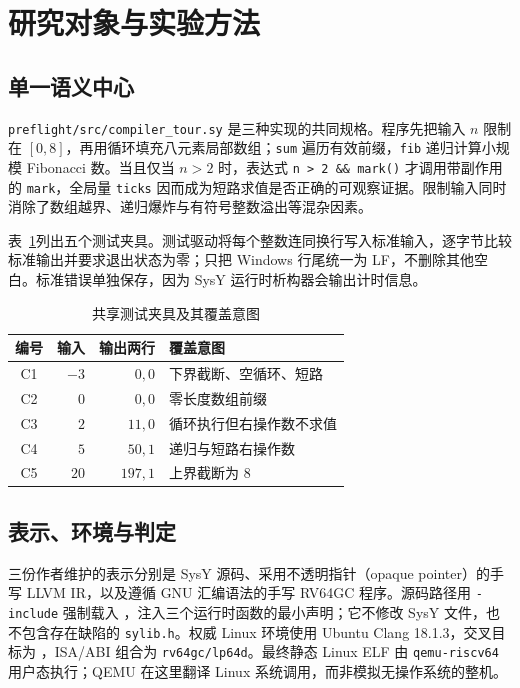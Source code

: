 \section{研究对象与实验方法}
\label{sec:method}

\subsection{单一语义中心}

\texttt{preflight/src/compiler\_tour.sy} 是三种实现的共同规格。程序先把输入 $n$ 限制在 $[0,8]$，再用循环填充八元素局部数组；\texttt{sum} 遍历有效前缀，\texttt{fib} 递归计算小规模 Fibonacci 数。当且仅当 $n>2$ 时，表达式 \texttt{n > 2 \&\& mark()} 才调用带副作用的 \texttt{mark}，全局量 \texttt{ticks} 因而成为短路求值是否正确的可观察证据。限制输入同时消除了数组越界、递归爆炸与有符号整数溢出等混杂因素。

表~\ref{tab:cases}列出五个测试夹具。测试驱动将每个整数连同换行写入标准输入，逐字节比较标准输出并要求退出状态为零；只把 Windows 行尾统一为 LF，不删除其他空白。标准错误单独保存，因为 SysY 运行时析构器会输出计时信息。

\begin{table}
\caption{共享测试夹具及其覆盖意图}
\label{tab:cases}
\centering
\begin{tabular}{crrl}
\toprule
编号 & 输入 & 输出两行 & 覆盖意图 \\
\midrule
C1 & $-3$ & $0,0$ & 下界截断、空循环、短路 \\
C2 & $0$  & $0,0$ & 零长度数组前缀 \\
C3 & $2$  & $11,0$ & 循环执行但右操作数不求值 \\
C4 & $5$  & $50,1$ & 递归与短路右操作数 \\
C5 & $20$ & $197,1$ & 上界截断为 8 \\
\bottomrule
\end{tabular}
\end{table}

\subsection{表示、环境与判定}

三份作者维护的表示分别是 SysY 源码、采用不透明指针（opaque pointer）的手写 LLVM IR，以及遵循 GNU 汇编语法的手写 RV64GC 程序。源码路径用 \texttt{-include} 强制载入 ，注入三个运行时函数的最小声明；它不修改 SysY 文件，也不包含存在缺陷的 \texttt{sylib.h}。权威 Linux 环境使用 Ubuntu Clang 18.1.3，交叉目标为 ，ISA/ABI 组合为 \texttt{rv64gc/lp64d}。最终静态 Linux ELF 由 \texttt{qemu-riscv64} 用户态执行；QEMU 在这里翻译 Linux 系统调用，而非模拟无操作系统的整机\cite{qemuUser}。

